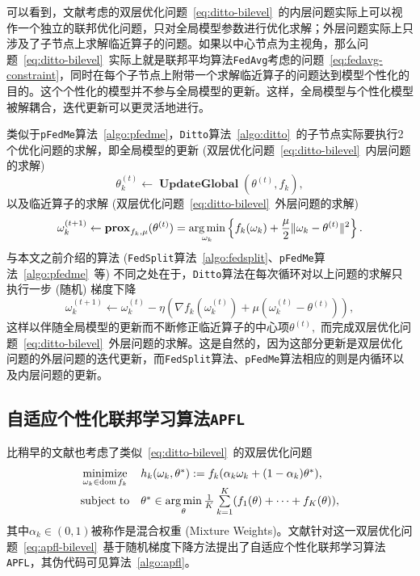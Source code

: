 

可以看到，文献\parencite{li_2021_ditto}考虑的双层优化问题~\eqref{eq:ditto-bilevel}~的内层问题实际上可以视作一个独立的联邦优化问题，只对全局模型参数进行优化求解；外层问题实际上只涉及了子节点上求解临近算子的问题。如果以中心节点为主视角，那么问题~\eqref{eq:ditto-bilevel}~实际上就是联邦平均算法\texttt{FedAvg}考虑的问题~\eqref{eq:fedavg-constraint}，同时在每个子节点上附带一个求解临近算子的问题达到模型个性化的目的。这个个性化的模型并不参与全局模型的更新。这样，全局模型与个性化模型被解耦合，迭代更新可以更灵活地进行。

类似于\texttt{pFedMe}算法~\ref{algo:pfedme}，\texttt{Ditto}算法~\ref{algo:ditto}~的子节点实际要执行2个优化问题的求解，即全局模型的更新 (双层优化问题~\eqref{eq:ditto-bilevel}~内层问题的求解)
\begin{equation}
\label{eq:ditto-global}
\theta_k^{(t)} \gets \operatorname{\mathbf{UpdateGlobal}}(\theta^{(t)}, f_k),
\end{equation}
以及临近算子的求解 (双层优化问题~\eqref{eq:ditto-bilevel}~外层问题的求解)
\begin{equation}
\label{eq:ditto-local-1}
\omega_k^{(t+1)} \gets \mathbf{prox}_{f_k, \mu} (\theta^{(t)}) = \operatorname*{arg\,min}\limits_{\omega_k} \left\{ f_k(\omega_k) + \frac{\mu}{2} \lVert \omega_k - \theta^{(t)} \rVert^2 \right\}.
\end{equation}
与本文之前介绍的算法 (\texttt{FedSplit}算法~\ref{algo:fedsplit}、\texttt{pFedMe}算法~\ref{algo:pfedme}~等) 不同之处在于，\texttt{Ditto}算法在每次循环对以上问题的求解只执行一步 (随机) 梯度下降
\begin{equation}
\label{eq:ditto-local-2}
\omega_k^{(t+1)} \gets \omega_k^{(t)} - \eta \left( \nabla f_k(\omega_k^{(t)}) + \mu (\omega_k^{(t)} - \theta^{(t)}) \right),
\end{equation}
这样以伴随全局模型的更新而不断修正临近算子的中心项$\theta^{(t)},$ 而完成双层优化问题~\eqref{eq:ditto-bilevel}~外层问题的求解。这是自然的，因为这部分更新是双层优化问题的外层问题的迭代更新，而\texttt{FedSplit}算法、\texttt{pFedMe}算法相应的则是内循环以及内层问题的更新。

\subsection*{自适应个性化联邦学习算法\texttt{APFL}}

比\parencite{li_2021_ditto}稍早的文献\parencite{deng2020_apfl}也考虑了类似~\eqref{eq:ditto-bilevel}~的双层优化问题
\begin{equation}
\label{eq:apfl-bilevel}
\begin{array}{cl}
\operatorname*{minimize}\limits_{\omega_k \in \operatorname{dom} f_k} & h_k(\omega_k, \theta^*) := f_k( \alpha_k \omega_k + (1 - \alpha_k) \theta^* ), \\
\text{subject to} & \theta^* \in \operatorname*{arg\,min}\limits_{\theta} \frac{1}{K} \sum\limits_{k=1}^K (f_1(\theta) + \cdots + f_K(\theta)),
\end{array}
\end{equation}
其中$\alpha_k \in (0, 1)$被称作是混合权重 (Mixture Weights)。文献\parencite{deng2020_apfl}针对这一双层优化问题~\eqref{eq:apfl-bilevel}~基于随机梯度下降方法提出了自适应个性化联邦学习算法\texttt{APFL}，其伪代码可见算法~\ref{algo:apfl}。

